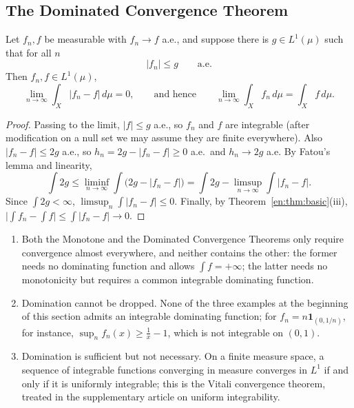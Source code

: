 \documentclass[11pt]{article}
\makeatletter
\newcommand{\envlabel}[1]{\protected@edef\@currentlabel{\themathenv}\label{#1}}
\makeatother
\begin{document}
\subsection{The Dominated Convergence Theorem}

\begin{theorem}\envlabel{en:thm:dct}
Let $f_{n},f$ be measurable with $f_{n}\to f$ a.e., and suppose there is $g\in L^{1}(\mu)$ such that for all $n$
\[
|f_{n}|\leq g\qquad\text{a.e.}
\]
Then $f_{n},f\in L^{1}(\mu)$,
\[
\lim_{n\to\infty}\int_{X}|f_{n}-f|\,d\mu=0,\qquad\text{and hence}\qquad\lim_{n\to\infty}\int_{X}f_{n}\,d\mu=\int_{X}f\,d\mu.
\]
\end{theorem}

\begin{proof}
Passing to the limit, $|f|\leq g$ a.e., so $f_{n}$ and $f$ are integrable (after modification on a null set we may assume they are finite everywhere). Also $|f_{n}-f|\leq2g$ a.e., so $h_{n}=2g-|f_{n}-f|\geq0$ a.e.\ and $h_{n}\to2g$ a.e. By Fatou's lemma and linearity,
\[
\int2g\leq\liminf_{n\to\infty}\int\big(2g-|f_{n}-f|\big)=\int2g-\limsup_{n\to\infty}\int|f_{n}-f|.
\]
Since $\int2g<\infty$, $\limsup_{n}\int|f_{n}-f|\leq0$. Finally, by Theorem~\ref{en:thm:basic}(iii), $\big|\int f_{n}-\int f\big|\leq\int|f_{n}-f|\to0$.
\end{proof}

\begin{remark}\envlabel{en:rem:dct}
\leavevmode
\begin{enumerate}
  \item Both the Monotone and the Dominated Convergence Theorems only require convergence almost everywhere, and neither contains the other: the former needs no dominating function and allows $\int f=+\infty$; the latter needs no monotonicity but requires a common integrable dominating function.
  \item Domination cannot be dropped. None of the three examples at the beginning of this section admits an integrable dominating function; for $f_{n}=n\mathbf{1}_{(0,1/n)}$, for instance, $\sup_{n}f_{n}(x)\geq\frac1x-1$, which is not integrable on $(0,1)$.
  \item Domination is sufficient but not necessary. On a finite measure space, a sequence of integrable functions converging in measure converges in $L^{1}$ if and only if it is uniformly integrable; this is the Vitali convergence theorem, treated in the supplementary article on uniform integrability.
\end{enumerate}
\end{remark}
\end{document}
